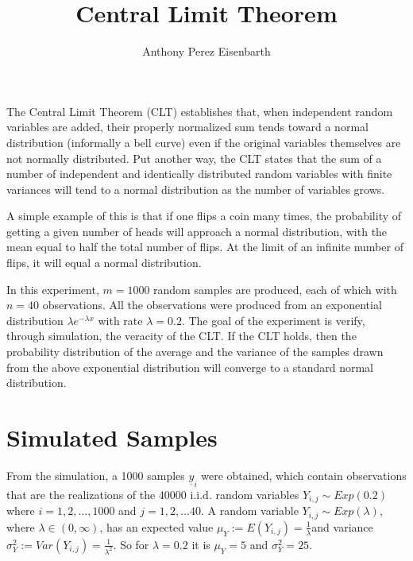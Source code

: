 \documentclass[
]{article}
\title{Central Limit Theorem}
\author{Anthony Perez Eisenbarth}
\date{}
\begin{document}
				\maketitle
				
							The Central Limit Theorem (CLT) establishes that, when
       independent random variables are added, their properly normalized
       sum tends toward a normal distribution (informally a bell curve)
       even if the original variables themselves are not normally
       distributed. Put another way, the CLT states that the sum of a
       number of independent and identically distributed random
       variables with finite variances will tend to a normal
       distribution as the number of variables grows.

       A simple example of this is that if one flips a coin many times,
       the probability of getting a given number of heads will approach
       a normal distribution, with the mean equal to half the total
       number of flips. At the limit of an infinite number of flips, it
       will equal a normal distribution.

       In this experiment, \(m = 1000\) random samples are produced,
       each of which with \(n = 40\) observations. All the observations
       were produced from an exponential distribution
       \(\lambda e^{-\lambda x}\) with rate \(\lambda = 0.2\). The goal
       of the experiment is verify, through simulation, the veracity of
       the CLT. If the CLT holds, then the probability distribution of
       the average and the variance of the samples drawn from the above
       exponential distribution will converge to a standard normal
       distribution.

       \hypertarget{simulated-samples}{%
       \section{Simulated Samples}\label{simulated-samples}}

       From the simulation, a 1000 samples \(\underline{y}_i\) were
       obtained, which contain observations that are the realizations of
       the 40000 i.i.d. random variables \(Y_{i,j} \sim Exp(0.2)\) where
       \(i = 1,2,\dots,1000\) and \(j = 1,2, \dots 40\). A random
       variable \(Y_{i,j} \sim Exp(\lambda)\), where
       \(\lambda \in (0, \infty)\), has an expected value
       \(\mu_Y := E(Y_{i,j}) = \frac{1}{\lambda}\)and variance
       \(\sigma_Y^2 := Var(Y_{i,j}) = \frac{1}{\lambda^2}\). So for
       \(\lambda = 0.2\) it is \(\mu_{Y} = 5\) and \(\sigma_Y^2 = 25\).
\end{document}
